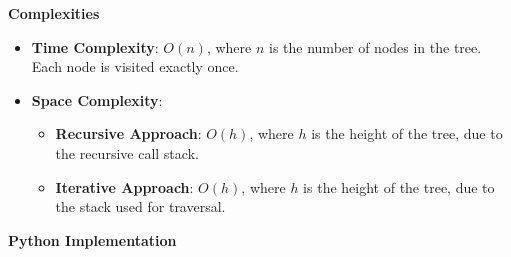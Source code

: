 \textbf{Complexities}

\begin{itemize}
    \item \textbf{Time Complexity}: \(O(n)\), where \(n\) is the number of nodes in the tree. Each node is visited exactly once.
    \item \textbf{Space Complexity}: 
    \begin{itemize}
        \item \textbf{Recursive Approach}: \(O(h)\), where \(h\) is the height of the tree, due to the recursive call stack.
        \item \textbf{Iterative Approach}: \(O(h)\), where \(h\) is the height of the tree, due to the stack used for traversal.
    \end{itemize}
\end{itemize}

\textbf{Python Implementation}


